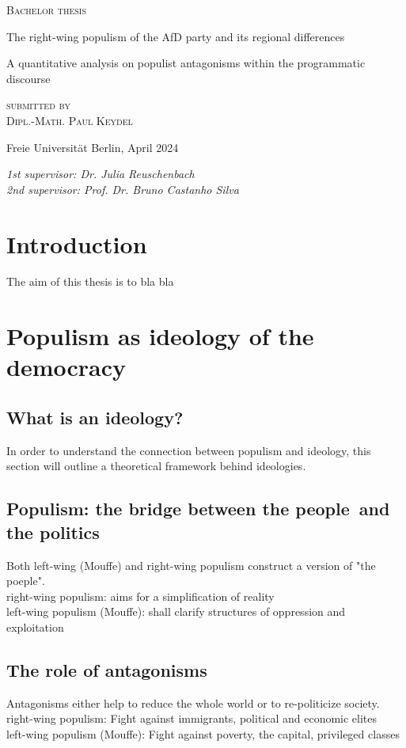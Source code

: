 \documentclass[a4paper]{scrreprt}
\begin{document}
\begin{titlepage}
\centering
{\large\textsc{Bachelor thesis}\par}
\vspace{8\baselineskip}
{\Huge The right-wing populism of the AfD party and its regional differences\par}
\vspace{2\baselineskip}
{\Large A quantitative analysis on populist antagonisms within the programmatic discourse\par}
\vspace{5\baselineskip}
{\large\textsc{submitted by\\[.5em]Dipl.-Math. Paul Keydel}\par}
\vspace{8\baselineskip}
{Freie Universität Berlin, April 2024\par}
\vfill
\raggedright
{\em 1st supervisor: Dr. Julia Reuschenbach\\}
{\em 2nd supervisor: Prof. Dr. Bruno Castanho Silva}
\end{titlepage}

\tableofcontents

\chapter{Introduction}
The aim of this thesis is to bla bla
\chapter{Populism as ideology of the democracy}
\section{What is an ideology?}
In order to understand the connection between populism and ideology, this section will outline a theoretical framework behind ideologies.
\section{Populism: the bridge between \guilsinglright the people\guilsinglleft\ and \guilsinglright the politics\guilsinglleft}
Both left-wing (Mouffe) and right-wing populism construct a version of "the poeple".\\
right-wing populism: aims for a simplification of reality\\
left-wing populism (Mouffe): shall clarify structures of oppression and exploitation
\section{The role of antagonisms}
Antagonisms either help to reduce the whole world or to re-politicize society.\\
right-wing populism: Fight against immigrants, political and economic elites\\
left-wing populism (Mouffe): Fight against poverty, the capital, privileged classes
\end{document}
